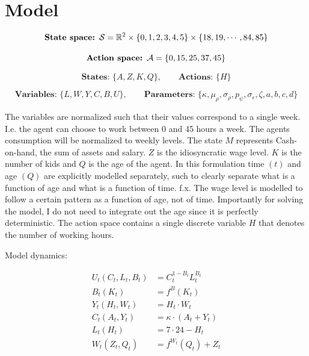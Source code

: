 \section{Model}

\begin{equation}
    \textbf{State space: }\mathcal{S} = \mathbb{R}^{2} \times \{0, 1, 2, 3, 4, 5\} \times \{ 18, 19, \cdots , 84, 85\}
\end{equation}

\begin{equation}
    \textbf{Action space: }\mathcal{A}  = \{0, 15, 25, 37, 45\}
\end{equation}

\begin{equation}
    \textbf{States: }\{A, Z, K, Q\}, \qquad \textbf{Actions: } \{H\} 
\end{equation}

\begin{equation}
    \textbf{Variables: }\{L, W, Y, C, B, U\},  \qquad \textbf{Parameters: } \{\kappa, \mu_\rho, \sigma_\rho, p_\psi, \sigma_\epsilon, \zeta, a, b, c, d\}
\end{equation}

The variables are normalized such that their values correspond to a single week. I.e. the agent can choose to work between 0 and 45 hours a week. The agents consumption will be normalized to weekly levels. The state $M$ represents Cash-on-hand, the sum of assets and salary. $Z$ is the idiosyncratic wage level. $K$ is the number of kids and $Q$ is the age of the agent. In this formulation time $(t)$ and age $(Q)$ are explicitly modelled separately, such to clearly separate what is a function of age and what is a function of time. f.x. The wage level is modelled to follow a certain pattern as a function of age, not of time. Importantly for solving the model, I do not need to integrate out the age since it is perfectly deterministic. The action space contains a single discrete variable $H$ that denotes the number of working hours.

Model dynamics:

\begin{align}
    U_t (C_t, L_t, B_t) &= C_t^{1-B_t}L_t^{B_t} \label{eq:utility_v1}\\
    B_t (K_t) &= f^{B}(K_t) \label{eq:alpha_v1}\\
    Y_t ( H_t, W_t) &= H_t \cdot W_t \label{eq:salary_v1}\\
    C_t (A_t, Y_t) &= \kappa \cdot (A_t + Y_t) \label{eq:consumption_v1}\\
    L_t(H_t) &= 7 \cdot 24 - H_t \label{eq:leisure_v1}\\
    W_t(Z_t, Q_t) &= f^{W_t}(Q_t) + Z_t \label{eq:wage_v1}
\end{align}

